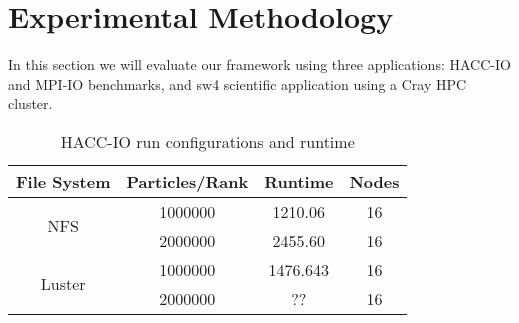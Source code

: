 \section{Experimental Methodology}\label{AA}
In this section we will evaluate our framework using three applications: HACC-IO and MPI-IO benchmarks, and sw4 scientific application using a Cray HPC cluster.

\begin{table}[]
	\centering
	\begin{tabular}{|c|c|c|c|}
		\hline
		File System	& Particles/Rank	& Runtime &	Nodes \\ \hline
		\multirow{2}{*}{NFS}	& 1000000	& 1210.06 &	16\\ \cline{2-4} 
		& 2000000	& 2455.60 &	16\\ \hline
		\multirow{2}{*}{Luster}	& 1000000	&  1476.643 &16 \\ \cline{2-4} 
		& 2000000	&  ?? &	16 \\ \hline
	\end{tabular}
	\caption{HACC-IO run configurations and runtime}
	\label{table:HACC}
\end{table}


